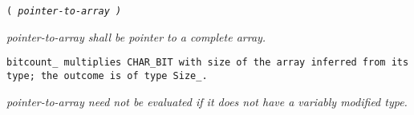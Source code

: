 
 \tt{(} \it{pointer-to-array} \tt{)}


\it{pointer-to-array} shall be pointer to a complete array.


\tt{bitcount_} multiplies \tt{CHAR_BIT} with size of the array
inferred from its type; the outcome is of type \tt{Size_}.

\it{pointer-to-array} need not be evaluated
if it does not have a variably modified type.
